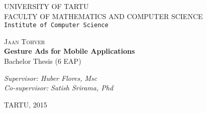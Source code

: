 \begin{titlepage}

\begin{center}



\textsc{UNIVERSITY OF TARTU}\\

\textsc{FACULTY OF MATHEMATICS AND COMPUTER SCIENCE}\\

\texttt{Institute of Computer Science}\\

\vspace{6 cm}


\textsc{ \large Jaan Tohver}\\[0.5cm]
{ \Huge \bfseries Gesture Ads for Mobile Applications}\\[0.5cm]
{\large Bachelor Thesis (6 EAP)}\\[3cm]



\begin{minipage}{0.8\textwidth}
\begin{flushright} \large
\emph{Supervisor: Huber Flores, Msc}  \\
\emph{Co-supervisor: Satish Srirama, Phd}  \\	  %
\end{flushright}
\end{minipage}   

\vfill

{\large TARTU, 2015}

\end{center}

\end{titlepage}